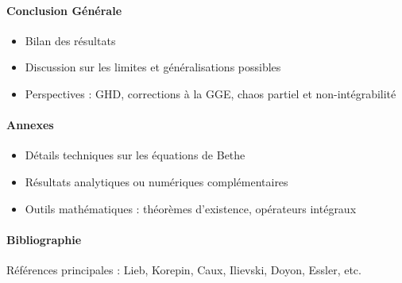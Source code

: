 \paragraph{Conclusion Générale}
\begin{itemize}
    \item Bilan des résultats
    \item Discussion sur les limites et généralisations possibles
    \item Perspectives : GHD, corrections à la GGE, chaos partiel et non-intégrabilité
\end{itemize}

\paragraph{Annexes}
\begin{itemize}
    \item Détails techniques sur les équations de Bethe
    \item Résultats analytiques ou numériques complémentaires
    \item Outils mathématiques : théorèmes d’existence, opérateurs intégraux
\end{itemize}

\paragraph{Bibliographie}
Références principales : Lieb, Korepin, Caux, Ilievski, Doyon, Essler, etc.